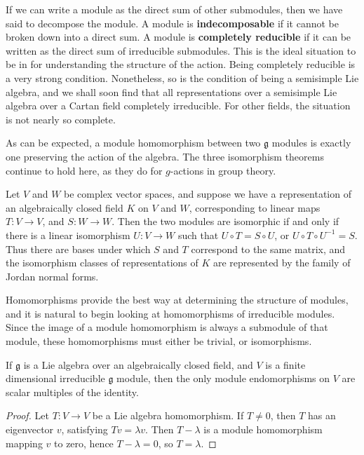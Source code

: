 If we can write a module as the direct sum of other submodules, then we have said to decompose the module. A module is {\bf indecomposable} if it cannot be broken down into a direct sum. A module is {\bf completely reducible} if it can be written as the direct sum of irreducible submodules. This is the ideal situation to be in for understanding the structure of the action. Being completely reducible is a very strong condition. Nonetheless, so is the condition of being a semisimple Lie algebra, and we shall soon find that all representations over a semisimple Lie algebra over a Cartan field completely irreducible. For other fields, the situation is not nearly so complete.

As can be expected, a module homomorphism between two $\mathfrak{g}$ modules is exactly one preserving the action of the algebra. The three isomorphism theorems continue to hold here, as they do for $g$-actions in group theory.

\begin{example}
    Let $V$ and $W$ be complex vector spaces, and suppose we have a representation of an algebraically closed field $K$ on $V$ and $W$, corresponding to linear maps $T: V \to V$, and $S: W \to W$. Then the two modules are isomorphic if and only if there is a linear isomorphism $U: V \to W$ such that $U \circ T = S \circ U$, or $U \circ T \circ U^{-1} = S$. Thus there are bases under which $S$ and $T$ correspond to the same matrix, and the isomorphism classes of representations of $K$ are represented by the family of Jordan normal forms.
\end{example}

Homomorphisms provide the best way at determining the structure of modules, and it is natural to begin looking at homomorphisms of irreducible modules. Since the image of a module homomorphism is always a submodule of that module, these homomorphisms must either be trivial, or isomorphisms.

\begin{lemma}[Schur]
    If $\mathfrak{g}$ is a Lie algebra over an algebraically closed field, and $V$ is a finite dimensional irreducible $\mathfrak{g}$ module, then the only module endomorphisms on $V$ are scalar multiples of the identity.
\end{lemma}
\begin{proof}
    Let $T: V \to V$ be a Lie algebra homomorphism. If $T \neq 0$, then $T$ has an eigenvector $v$, satisfying $Tv = \lambda v$. Then $T - \lambda$ is a module homomorphism mapping $v$ to zero, hence $T - \lambda = 0$, so $T = \lambda$.
\end{proof}

